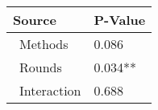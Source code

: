 
\centering
\begin{tabular}{ll}
\toprule
          Source & P-Value \\
\midrule
    \    Methods &   0.086 \\
     \    Rounds & 0.034** \\
\    Interaction &   0.688 \\
\bottomrule
\end{tabular}

